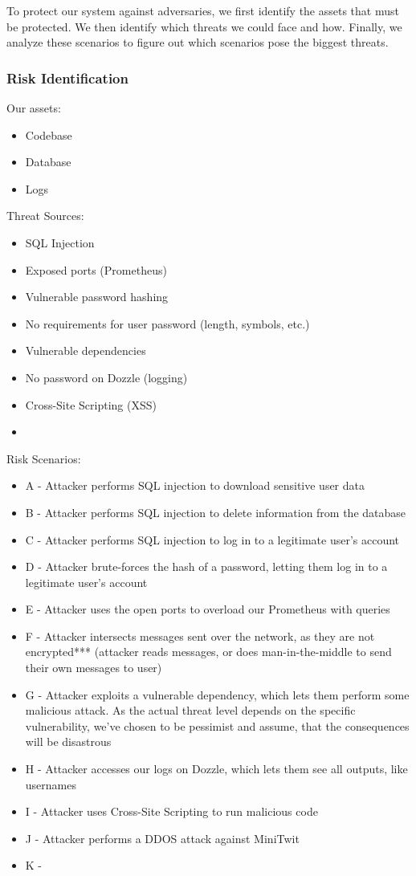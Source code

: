 To protect our system against adversaries, we first identify the assets that must be protected. We then identify which threats we could face and how. Finally, we analyze these scenarios to figure out which scenarios pose the biggest threats.

\subsubsection{Risk Identification}
Our assets:
\begin{itemize}
    \item Codebase
    \item Database
    \item Logs
\end{itemize}

Threat Sources:
\begin{itemize}
    \item SQL Injection
    \item Exposed ports (Prometheus)
    \item Vulnerable password hashing
    \item No requirements for user password (length, symbols, etc.)
    \item Vulnerable dependencies
    \item No password on Dozzle (logging)
    \item Cross-Site Scripting (XSS)
    \item 
\end{itemize}

Risk Scenarios:
\begin{itemize}
    \item A - Attacker performs SQL injection to download sensitive user data
    \item B - Attacker performs SQL injection to delete information from the database
    \item C - Attacker performs SQL injection to log in to a legitimate user's account
    \item D - Attacker brute-forces the hash of a password, letting them log in to a legitimate user's account
    \item E - Attacker uses the open ports to overload our Prometheus with queries
    \item F - Attacker intersects messages sent over the network, as they are not encrypted*** (attacker reads messages, or does man-in-the-middle to send their own messages to user)
    \item G - Attacker exploits a vulnerable dependency, which lets them perform some malicious attack. As the actual threat level depends on the specific vulnerability, we've chosen to be pessimist and assume, that the consequences will be disastrous
    \item H - Attacker accesses our logs on Dozzle, which lets them see all outputs, like usernames
    \item I - Attacker uses Cross-Site Scripting to run malicious code
    \item J - Attacker performs a DDOS attack against MiniTwit
    \item K - 
\end{itemize}


